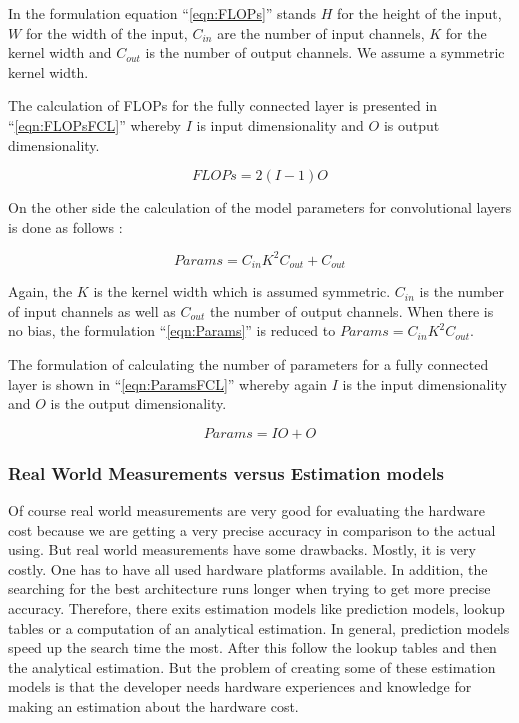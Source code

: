 \documentclass[conference]{IEEEtran}
\begin{document}
In the formulation equation ``\eqref{eqn:FLOPs}'' stands $H$ for the height of the input, $W$ for the width of the input, $C_{in}$ are the number of input channels, $K$ for the kernel width and $C_{out}$ is the number of output channels. We assume a symmetric kernel width. 

The calculation of FLOPs for the fully connected layer is presented in ``\eqref{eqn:FLOPsFCL}'' whereby $I$ is input dimensionality and $O$ is output dimensionality. 

\begin{equation}
\label{eqn:FLOPsFCL}
FLOPs = 2(I-1)O
\end{equation} 

On the other side the calculation of the model parameters for convolutional layers is done as follows \cite{bib6}:

\begin{equation}
\label{eqn:Params}
Params = C_{in}K^{2}C_{out}+C_{out}
\end{equation} 

Again, the $K$ is the kernel width which is assumed symmetric. $C_{in}$ is the number of input channels as well as $C_{out}$ the number of output channels. When there is no bias, the formulation ``\eqref{eqn:Params}'' is reduced to $Params = C_{in}K^{2}C_{out}$. 

The formulation of calculating the number of parameters for a fully connected layer is shown in ``\eqref{eqn:ParamsFCL}'' whereby again $I$ is the input dimensionality and $O$ is the output dimensionality. 

\begin{equation}
\label{eqn:ParamsFCL}
Params = IO+O
\end{equation}  


\subsubsection{Real World Measurements versus Estimation models}

Of course real world measurements are very good for evaluating the hardware cost because we are getting a very precise accuracy in comparison to the actual using. But real world measurements have some drawbacks. Mostly, it is very costly. One has to have all used hardware platforms available. In addition, the searching for the best architecture runs longer when trying to get more precise accuracy. Therefore, there exits estimation models like prediction models, lookup tables or a computation of an analytical estimation. In general, prediction models speed up the search time the most. After this follow the lookup tables and then the analytical estimation. But the problem of creating some of these estimation models is that the developer needs hardware experiences and knowledge for making an estimation about the hardware cost.
\end{document}
